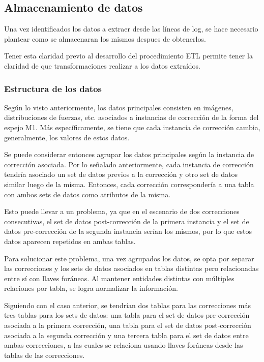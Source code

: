 \subsection{Almacenamiento de datos}

Una vez identificados los datos a extraer desde las líneas de log, se hace necesario plantear como se almacenaran los mismos despues de obtenerlos. 

Tener esta claridad previo al desarrollo del procedimiento ETL permite tener la claridad de que transformaciones realizar a los datos extraídos.

\subsubsection{Estructura de los datos}

Según lo visto anteriormente, los datos principales consisten en imágenes, distribuciones de fuerzas, etc. asociados a instancias de corrección de la forma del espejo M1. Más específicamente, se tiene que cada instancia de corrección cambia, generalmente, los valores de estos datos. 

Se puede considerar entonces agrupar los datos principales según la instancia de corrección asociada. Por lo señalado anteriormente, cada instancia de corrección tendría asociado un set de datos previos a la corrección y otro set de datos similar luego de la misma. Entonces, cada corrección correspondería a una tabla con ambos sets de datos como atributos de la misma.

Esto puede llevar a un problema, ya que en el escenario de dos correcciones consecutivas, el set de datos post-corrección de la primera instancia y el set de datos pre-corrección de la segunda instancia serían los mismos, por lo que estos datos aparecen repetidos en ambas tablas.

Para solucionar este problema, una vez agrupados los datos, se opta por separar las correcciones y los sets de datos asociados en tablas distintas pero relacionadas entre sí con llaves foráneas. Al mantener entidades distintas con múltiples relaciones por tabla, se logra normalizar la información.

Siguiendo con el caso anterior, se tendrían dos tablas para las correcciones más tres tablas para los sets de datos: una tabla para el set de datos pre-corrección asociada a la primera corrección, una tabla para el set de datos post-corrección asociada a la segunda corrección y una tercera tabla para el set de datos entre ambas correcciones, a las cuales se relaciona usando llaves foráneas desde las tablas de las correcciones.

